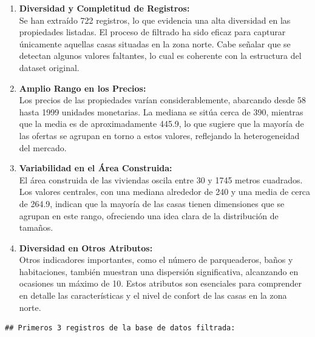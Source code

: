 \documentclass[
]{article}
\begin{document}
\begin{enumerate}
\def\labelenumi{\arabic{enumi}.}
\item
  \textbf{Diversidad y Completitud de Registros:}\\
  Se han extraído 722 registros, lo que evidencia una alta diversidad en
  las propiedades listadas. El proceso de filtrado ha sido eficaz para
  capturar únicamente aquellas casas situadas en la zona norte. Cabe
  señalar que se detectan algunos valores faltantes, lo cual es
  coherente con la estructura del dataset original.
\item
  \textbf{Amplio Rango en los Precios:}\\
  Los precios de las propiedades varían considerablemente, abarcando
  desde 58 hasta 1999 unidades monetarias. La mediana se sitúa cerca de
  390, mientras que la media es de aproximadamente 445.9, lo que sugiere
  que la mayoría de las ofertas se agrupan en torno a estos valores,
  reflejando la heterogeneidad del mercado.
\item
  \textbf{Variabilidad en el Área Construida:}\\
  El área construida de las viviendas oscila entre 30 y 1745 metros
  cuadrados. Los valores centrales, con una mediana alrededor de 240 y
  una media de cerca de 264.9, indican que la mayoría de las casas
  tienen dimensiones que se agrupan en este rango, ofreciendo una idea
  clara de la distribución de tamaños.
\item
  \textbf{Diversidad en Otros Atributos:}\\
  Otros indicadores importantes, como el número de parqueaderos, baños y
  habitaciones, también muestran una dispersión significativa,
  alcanzando en ocasiones un máximo de 10. Estos atributos son
  esenciales para comprender en detalle las características y el nivel
  de confort de las casas en la zona norte.
\end{enumerate}

\begin{verbatim}
## Primeros 3 registros de la base de datos filtrada:
\end{verbatim}
\end{document}
